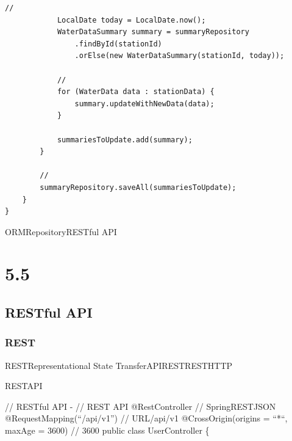 \begin{lstlisting}[style=java]
            // 
            LocalDate today = LocalDate.now();
            WaterDataSummary summary = summaryRepository
                .findById(stationId)
                .orElse(new WaterDataSummary(stationId, today));
            
            // 
            for (WaterData data : stationData) {
                summary.updateWithNewData(data);
            }
            
            summariesToUpdate.add(summary);
        }
        
        // 
        summaryRepository.saveAll(summariesToUpdate);
    }
}
\end{lstlisting}

ORMRepositoryRESTful API

\hypertarget{section-71}{%
\section{5.5}\label{section-71}}

\important{}

\hypertarget{restful-api}{%
\subsection{RESTful API}\label{restful-api}}

\hypertarget{rest}{%
\subsubsection{REST}\label{rest}}

RESTRepresentational State TransferAPIRESTRESTHTTP

RESTAPI

// RESTful API - // REST API @RestController // SpringRESTJSON
@RequestMapping(``/api/v1'') // URL/api/v1 @CrossOrigin(origins = ``*``,
maxAge = 3600) // 3600 public class UserController \{

